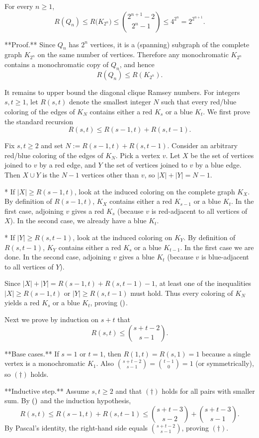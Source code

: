 For every $n\ge 1$,
\[
R(Q_n)\le R\bigl(K_{2^n}\bigr)\le \binom{2^{n+1}-2}{2^n-1}\le 4^{2^n}=2^{2^{n+1}}.
\]

**Proof.**
Since $Q_n$ has $2^n$ vertices, it is a (spanning) subgraph of the complete graph $K_{2^n}$ on the same number of vertices.
Therefore any monochromatic $K_{2^n}$ contains a monochromatic copy of $Q_n$, and hence
\[
R(Q_n)\le R(K_{2^n}).
\]

It remains to upper bound the diagonal clique Ramsey numbers.
For integers $s,t\ge 1$, let $R(s,t)$ denote the smallest integer $N$ such that every red/blue coloring of the edges of $K_N$ contains either a red $K_s$ or a blue $K_t$.
We first prove the standard recursion
\[
R(s,t)\le R(s-1,t)+R(s,t-1). \tag{$\*$}
\]

Fix $s,t\ge 2$ and set $N:=R(s-1,t)+R(s,t-1)$.
Consider an arbitrary red/blue coloring of the edges of $K_N$.
Pick a vertex $v$.
Let $X$ be the set of vertices joined to $v$ by a red edge, and $Y$ the set of vertices joined to $v$ by a blue edge.
Then $X\cup Y$ is the $N-1$ vertices other than $v$, so $|X|+|Y|=N-1$.

* If $|X|\ge R(s-1,t)$, look at the induced coloring on the complete graph $K_X$.
  By definition of $R(s-1,t)$, $K_X$ contains either a red $K_{s-1}$ or a blue $K_t$.
  In the first case, adjoining $v$ gives a red $K_s$ (because $v$ is red-adjacent to all vertices of $X$).
  In the second case, we already have a blue $K_t$.

* If $|Y|\ge R(s,t-1)$, look at the induced coloring on $K_Y$.
  By definition of $R(s,t-1)$, $K_Y$ contains either a red $K_s$ or a blue $K_{t-1}$.
  In the first case we are done.
  In the second case, adjoining $v$ gives a blue $K_t$ (because $v$ is blue-adjacent to all vertices of $Y$).

Since $|X|+|Y|=R(s-1,t)+R(s,t-1)-1$, at least one of the inequalities $|X|\ge R(s-1,t)$ or $|Y|\ge R(s,t-1)$ must hold.
Thus every coloring of $K_N$ yields a red $K_s$ or a blue $K_t$, proving $(\*)$.

Next we prove by induction on $s+t$ that
\[
R(s,t)\le \binom{s+t-2}{s-1}. \tag{$\dagger$}
\]

**Base cases.** If $s=1$ or $t=1$, then $R(1,t)=R(s,1)=1$ because a single vertex is a monochromatic $K_1$.
Also $\binom{s+t-2}{s-1}=\binom{t-1}{0}=1$ (or symmetrically), so $(\dagger)$ holds.

**Inductive step.** Assume $s,t\ge 2$ and that $(\dagger)$ holds for all pairs with smaller sum.
By $(\*)$ and the induction hypothesis,
\[
R(s,t)\le R(s-1,t)+R(s,t-1)
\le \binom{s+t-3}{s-2}+\binom{s+t-3}{s-1}.
\]
By Pascal's identity, the right-hand side equals $\binom{s+t-2}{s-1}$, proving $(\dagger)$.

